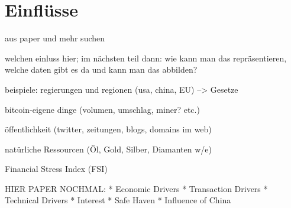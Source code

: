 \chapter{Einflüsse}

aus paper und mehr suchen

welchen einluss hier; im nächsten teil dann:
wie kann man das repräsentieren, welche daten gibt es da und kann man das abbilden?

beispiele:
regierungen und regionen (usa, china, EU) --> Gesetze

bitcoin-eigene dinge (volumen, umschlag, miner? etc.)

öffentlichkeit (twitter, zeitungen, blogs, domains im web)

natürliche Ressourcen (Öl, Gold, Silber, Diamanten w/e)

Financial Stress Index (FSI)


HIER PAPER NOCHMAL:
* Economic Drivers
* Transaction Drivers
* Technical Drivers
* Interest
* Safe Haven
* Influence of China